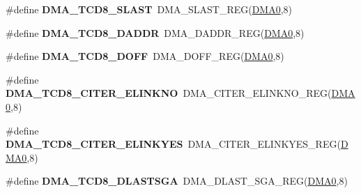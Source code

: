 \begin{DoxyCompactItemize}
\item 
\#define {\bfseries D\+M\+A\+\_\+\+T\+C\+D8\+\_\+\+S\+L\+A\+ST}~D\+M\+A\+\_\+\+S\+L\+A\+S\+T\+\_\+\+R\+EG(\hyperlink{group__DMA__Peripheral__Access__Layer_ga4103044f9ca209772f513dc694513ffb}{D\+M\+A0},8)\hypertarget{group__DMA__Register__Accessor__Macros_ga3c48604678432613c2255a9ccf1ee23c}{}\label{group__DMA__Register__Accessor__Macros_ga3c48604678432613c2255a9ccf1ee23c}

\item 
\#define {\bfseries D\+M\+A\+\_\+\+T\+C\+D8\+\_\+\+D\+A\+D\+DR}~D\+M\+A\+\_\+\+D\+A\+D\+D\+R\+\_\+\+R\+EG(\hyperlink{group__DMA__Peripheral__Access__Layer_ga4103044f9ca209772f513dc694513ffb}{D\+M\+A0},8)\hypertarget{group__DMA__Register__Accessor__Macros_ga6585193ba70d793fa96c368446847218}{}\label{group__DMA__Register__Accessor__Macros_ga6585193ba70d793fa96c368446847218}

\item 
\#define {\bfseries D\+M\+A\+\_\+\+T\+C\+D8\+\_\+\+D\+O\+FF}~D\+M\+A\+\_\+\+D\+O\+F\+F\+\_\+\+R\+EG(\hyperlink{group__DMA__Peripheral__Access__Layer_ga4103044f9ca209772f513dc694513ffb}{D\+M\+A0},8)\hypertarget{group__DMA__Register__Accessor__Macros_ga87de01c15f745a0d3fb02b2b0b13764c}{}\label{group__DMA__Register__Accessor__Macros_ga87de01c15f745a0d3fb02b2b0b13764c}

\item 
\#define {\bfseries D\+M\+A\+\_\+\+T\+C\+D8\+\_\+\+C\+I\+T\+E\+R\+\_\+\+E\+L\+I\+N\+K\+NO}~D\+M\+A\+\_\+\+C\+I\+T\+E\+R\+\_\+\+E\+L\+I\+N\+K\+N\+O\+\_\+\+R\+EG(\hyperlink{group__DMA__Peripheral__Access__Layer_ga4103044f9ca209772f513dc694513ffb}{D\+M\+A0},8)\hypertarget{group__DMA__Register__Accessor__Macros_ga6da76173da694902dd5e5974ed7f9efd}{}\label{group__DMA__Register__Accessor__Macros_ga6da76173da694902dd5e5974ed7f9efd}

\item 
\#define {\bfseries D\+M\+A\+\_\+\+T\+C\+D8\+\_\+\+C\+I\+T\+E\+R\+\_\+\+E\+L\+I\+N\+K\+Y\+ES}~D\+M\+A\+\_\+\+C\+I\+T\+E\+R\+\_\+\+E\+L\+I\+N\+K\+Y\+E\+S\+\_\+\+R\+EG(\hyperlink{group__DMA__Peripheral__Access__Layer_ga4103044f9ca209772f513dc694513ffb}{D\+M\+A0},8)\hypertarget{group__DMA__Register__Accessor__Macros_gae6a4aaa8869815edf82c900a92bdfe92}{}\label{group__DMA__Register__Accessor__Macros_gae6a4aaa8869815edf82c900a92bdfe92}

\item 
\#define {\bfseries D\+M\+A\+\_\+\+T\+C\+D8\+\_\+\+D\+L\+A\+S\+T\+S\+GA}~D\+M\+A\+\_\+\+D\+L\+A\+S\+T\+\_\+\+S\+G\+A\+\_\+\+R\+EG(\hyperlink{group__DMA__Peripheral__Access__Layer_ga4103044f9ca209772f513dc694513ffb}{D\+M\+A0},8)\hypertarget{group__DMA__Register__Accessor__Macros_ga1337c2ad5e7240758afd7abec5e06af4}{}\label{group__DMA__Register__Accessor__Macros_ga1337c2ad5e7240758afd7abec5e06af4}


\end{DoxyCompactItemize}
